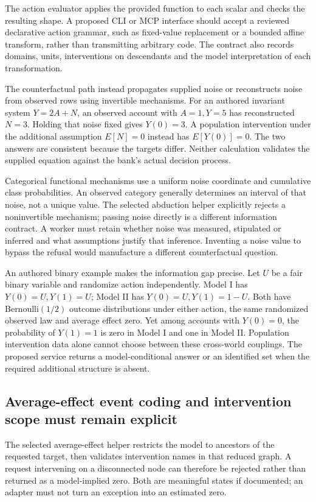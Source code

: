 The action evaluator applies the provided function to each scalar and
checks the resulting shape. A proposed CLI or MCP interface should accept
a reviewed declarative action grammar, such as fixed-value replacement
or a bounded affine transform, rather than transmitting arbitrary code.
The contract also records domains, units, interventions on descendants
and the model interpretation of each transformation.
\citep{exec24_gcm_source,exec24_gcm_choice}

The counterfactual path instead propagates supplied noise or reconstructs
noise from observed rows using invertible mechanisms. For an authored
invariant system $Y=2A+N$, an observed account with $A=1,Y=5$ has
reconstructed $N=3$. Holding that noise fixed gives $Y(0)=3$.
A population intervention under the additional assumption $E[N]=0$
instead has $E[Y(0)]=0$. The two answers are consistent because the
targets differ. Neither calculation validates the supplied equation
against the bank's actual decision process.~\citep{exec24_gcm_choice}

Categorical functional mechanisms use a uniform noise coordinate and
cumulative class probabilities. An observed category generally determines
an interval of that noise, not a unique value. The selected abduction
helper explicitly rejects a noninvertible mechanism; passing noise
directly is a different information contract. A worker must retain whether
noise was measured, stipulated or inferred and what assumptions justify
that inference. Inventing a noise value to bypass the refusal would
manufacture a different counterfactual question.
\citep{exec24_gcm_source,exec24_gcm_choice}

An authored binary example makes the information gap precise. Let
$U$ be a fair binary variable and randomize action independently. Model
I has $Y(0)=U,Y(1)=U$; Model II has $Y(0)=U,Y(1)=1-U$.
Both have Bernoulli$(1/2)$ outcome distributions under either action,
the same randomized observed law and average effect zero. Yet among
accounts with $Y(0)=0$, the probability of $Y(1)=1$ is zero in Model I
and one in Model II. Population intervention data alone cannot choose
between these cross-world couplings. The proposed service returns a
model-conditional answer or an identified set when the required additional
structure is absent.~\citep{exec24_gcm_choice}

\subsection{Average-effect event coding and intervention scope must remain explicit}
The selected average-effect helper restricts the model to ancestors of
the requested target, then validates intervention names in that reduced
graph. A request intervening on a disconnected node can therefore be
rejected rather than returned as a model-implied zero. Both are meaningful
states if documented; an adapter must not turn an exception into an
estimated zero.~\citep{exec24_gcm_source,exec24_gcm_choice}

